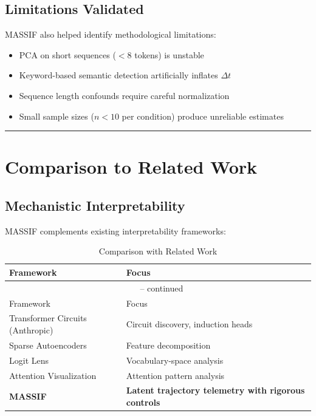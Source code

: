 \documentclass[12pt,a4paper]{article}
\begin{document}
\subsection{Limitations Validated}

MASSIF also helped identify methodological limitations:
\begin{itemize}
    \item PCA on short sequences (\(<8\) tokens) is unstable
    \item Keyword-based semantic detection artificially inflates \(\Delta t\)
    \item Sequence length confounds require careful normalization
    \item Small sample sizes (\(n<10\) per condition) produce unreliable estimates
\end{itemize}

\medskip
\hrule
\medskip

\section{Comparison to Related Work}

\subsection{Mechanistic Interpretability}

MASSIF complements existing interpretability frameworks:

\begin{longtable}{p{} p{}}
\caption{Comparison with Related Work}
\label{tab:comparison}\\
\toprule
Framework & Focus \\
\midrule
\endfirsthead
\multicolumn{2}{c}{{\tablename\ \thetable{} -- continued}} \\
\toprule
Framework & Focus \\
\midrule
\endhead
\bottomrule
\endfoot
Transformer Circuits (Anthropic) & Circuit discovery, induction heads \\
Sparse Autoencoders & Feature decomposition \\
Logit Lens & Vocabulary-space analysis \\
Attention Visualization & Attention pattern analysis \\
\hline
\textbf{MASSIF} & \textbf{Latent trajectory telemetry with rigorous controls} \\
\end{longtable}
\end{document}
